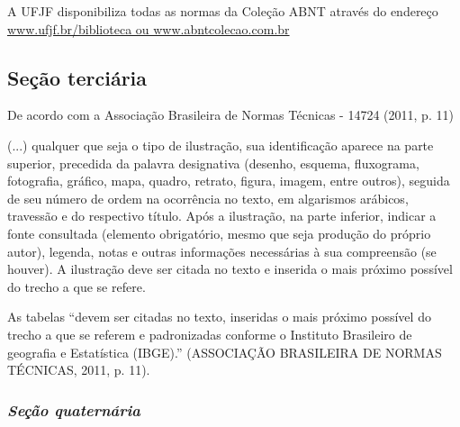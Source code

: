 \documentclass[
        12pt,
        openany, %
        oneside, %
        a4paper,
        english,
        brazil			        %
        ]{abntbibufjf}
\begin{document}
A UFJF disponibiliza todas as normas da Cole\c{c}\~ao ABNT atrav\'es do endere\c{c}o
\url{www.ufjf.br/biblioteca ou www.abntcolecao.com.br}

\subsection{\textbf{Se\c{c}\~ao terci\'aria}} %

De acordo com a Associa\c{c}\~ao Brasileira de Normas T\'ecnicas - 14724 (2011, p. 11)
\begin{citacao}
 (...) qualquer que seja o tipo de ilustra\c{c}\~ao, sua identifica\c{c}\~ao aparece na parte superior,
 precedida da palavra designativa (desenho, esquema, fluxograma, fotografia, gr\'afico, mapa,
 quadro, retrato, figura, imagem, entre outros), seguida de seu n\'umero de ordem na ocorr\^encia
 no texto, em algarismos ar\'abicos, travess\~ao e do respectivo t\'itulo. Ap\'os a ilustra\c{c}\~ao,
 na parte inferior, indicar a fonte consultada (elemento obrigat\'orio, mesmo que seja produ\c{c}\~ao
 do pr\'oprio autor), legenda, notas e outras informa\c{c}\~oes necess\'arias \`a sua compreens\~ao (se houver).
 A ilustra\c{c}\~ao deve ser citada no texto e inserida o mais pr\'oximo poss\'ivel do trecho a que se refere.
\end{citacao}

As tabelas ``devem ser citadas no texto, inseridas o mais pr\'oximo poss\'ivel do trecho a que se
referem e padronizadas conforme o Instituto Brasileiro de geografia e Estat\'istica (IBGE).''
(ASSOCIA\c{C}\~AO BRASILEIRA DE NORMAS T\'ECNICAS, 2011, p. 11).



\subsubsection{\textit{Se\c{c}\~ao quatern\'aria}} %
\end{document}
